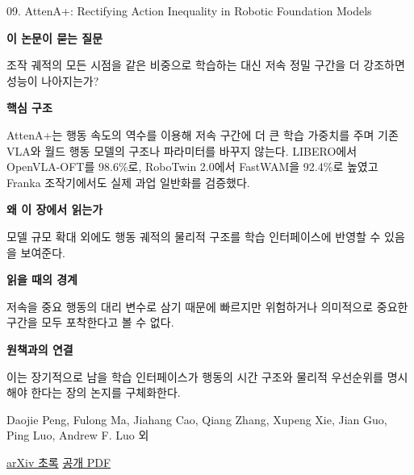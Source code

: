 \documentclass[11pt,openany]{book}
\begin{document}
\begin{termcard}{09. AttenA+: Rectifying Action Inequality in Robotic Foundation Models}

\par

\medskip

{\sffamily\bfseries\color{deepblue} 이 논문이 묻는 질문}\par

조작 궤적의 모든 시점을 같은 비중으로 학습하는 대신 저속 정밀 구간을 더 강조하면 성능이 나아지는가?

\smallskip

{\sffamily\bfseries\color{deepblue} 핵심 구조}\par

AttenA+는 행동 속도의 역수를 이용해 저속 구간에 더 큰 학습 가중치를 주며 기존 VLA와 월드 행동 모델의 구조나 파라미터를 바꾸지 않는다. LIBERO에서 OpenVLA-OFT를 98.6\%로, RoboTwin 2.0에서 FastWAM을 92.4\%로 높였고 Franka 조작기에서도 실제 과업 일반화를 검증했다.

\smallskip

{\sffamily\bfseries\color{deepblue} 왜 이 장에서 읽는가}\par

모델 규모 확대 외에도 행동 궤적의 물리적 구조를 학습 인터페이스에 반영할 수 있음을 보여준다.

\smallskip

{\sffamily\bfseries\color{coral} 읽을 때의 경계}\par

저속을 중요 행동의 대리 변수로 삼기 때문에 빠르지만 위험하거나 의미적으로 중요한 구간을 모두 포착한다고 볼 수 없다.

\smallskip

{\sffamily\bfseries\color{teal} 원책과의 연결}\par

이는 장기적으로 남을 학습 인터페이스가 행동의 시간 구조와 물리적 우선순위를 명시해야 한다는 장의 논지를 구체화한다.

\medskip

{\footnotesize\color{muted} Daojie Peng, Fulong Ma, Jiahang Cao, Qiang Zhang, Xupeng Xie, Jian Guo, Ping Luo, Andrew F. Luo 외\par

\href{https://arxiv.org/abs/2605.13548}{arXiv 초록} \quad \href{https://arxiv.org/pdf/2605.13548}{공개 PDF}\par}

\end{termcard}
\end{document}
